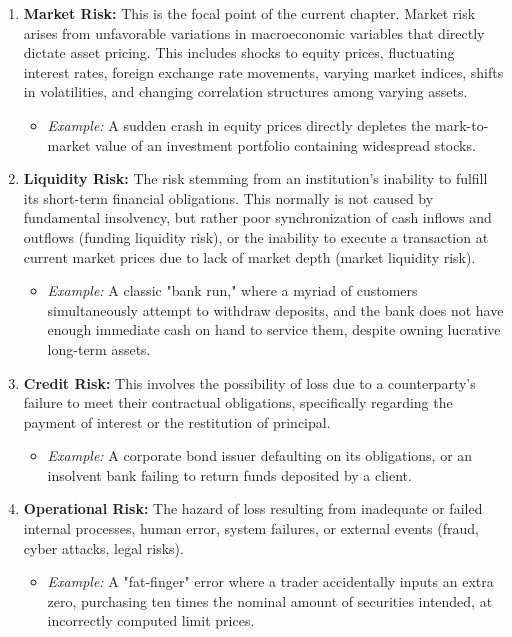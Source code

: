 \begin{enumerate}
    \item \textbf{Market Risk:} This is the focal point of the current chapter. Market risk arises from unfavorable variations in macroeconomic variables that directly dictate asset pricing. This includes shocks to equity prices, fluctuating interest rates, foreign exchange rate movements, varying market indices, shifts in volatilities, and changing correlation structures among varying assets. 
    \begin{itemize}
        \item \textit{Example:} A sudden crash in equity prices directly depletes the mark-to-market value of an investment portfolio containing widespread stocks.
    \end{itemize}
    
    \item \textbf{Liquidity Risk:} The risk stemming from an institution's inability to fulfill its short-term financial obligations. This normally is not caused by fundamental insolvency, but rather poor synchronization of cash inflows and outflows (funding liquidity risk), or the inability to execute a transaction at current market prices due to lack of market depth (market liquidity risk).
    \begin{itemize}
        \item \textit{Example:} A classic "bank run," where a myriad of customers simultaneously attempt to withdraw deposits, and the bank does not have enough immediate cash on hand to service them, despite owning lucrative long-term assets.
    \end{itemize}

    \item \textbf{Credit Risk:} This involves the possibility of loss due to a counterparty's failure to meet their contractual obligations, specifically regarding the payment of interest or the restitution of principal.
    \begin{itemize}
        \item \textit{Example:} A corporate bond issuer defaulting on its obligations, or an insolvent bank failing to return funds deposited by a client.
    \end{itemize}

    \item \textbf{Operational Risk:} The hazard of loss resulting from inadequate or failed internal processes, human error, system failures, or external events (fraud, cyber attacks, legal risks).
    \begin{itemize}
        \item \textit{Example:} A "fat-finger" error where a trader accidentally inputs an extra zero, purchasing ten times the nominal amount of securities intended, at incorrectly computed limit prices.
    \end{itemize}
\end{enumerate}

